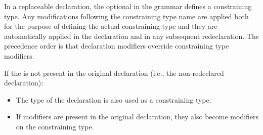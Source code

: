 In a replaceable declaration, the optional  in the grammar defines a constraining type.
Any modifications following the constraining type name are applied both for the purpose of defining the actual constraining type and they are automatically applied in the declaration and in any subsequent redeclaration.
The precedence order is that declaration modifiers override constraining type modifiers.

If the  is not present in the original declaration (i.e., the non-redeclared declaration):
\begin{itemize}
\item
  The type of the declaration is also used as a constraining type.
\item
  If modifiers are present in the original declaration, they also become modifiers on the constraining type.
\end{itemize}

